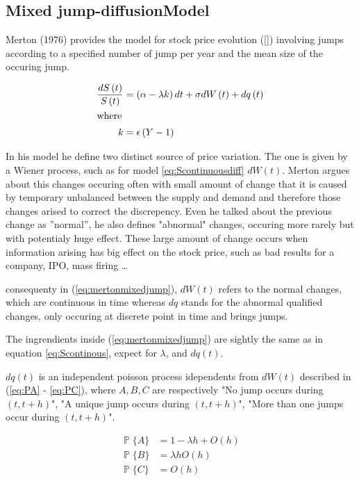 \documentclass[12pt]{report}
\newcommand{\dBm}{dW\left(t\right)}
\newcommand{\dpoiss}{dq\left(t\right)}
\newcommand{\Bm}{W\left(t\right)}
\newcommand{\St}{S\left(t\right)}
\newcommand{\dSt}{dS\left(t\right)}
\newcommand{\dSr}{\frac{\dSt}{\St}}
\begin{document}
\subsection{Mixed jump-diffusionModel}
\label{sub:MixedJump}

Merton (1976) provides the model for stock price evolution (\ref{}) involving jumps according to a specified number of jump per year and the mean size of the occuring jump. 


\begin{align}
   \dSr  &= \left(\alpha - \lambda k\right) dt + \sigma \dBm + \dpoiss \\ \intertext{where}
     \label{eq:mertonmixedjump}
    k &= \epsilon\left(Y-1\right)
\end{align}

In his model he define two distinct source of price variation. The one is given by a Wiener process, such as for model \ref{eq:Scontinuousdiff} $d\Bm$. Merton argues about this changes occuring often with small amount of change that it is caused by temporary unbalanced between the supply and demand and therefore those changes arised to correct the discrepency. Even he talked about the previous change as ''normal'', he also defines "abnormal" changes, occuring more rarely but with potentialy huge effect. These large amount of change occurs when information arising has big effect on the stock price, such as bad results for a company, IPO, mass firing \ldots

consequenty in (\ref{eq:mertonmixedjump}), $\dBm$ refers to the normal changes, which are continuous in time whereas $dq$ stands for the abnormal qualified changes, only occuring at discrete point in time and brings jumps.

The ingrendients inside (\ref{eq:mertonmixedjump}) are sightly the same as in equation \ref{eq:Scontinous}, expect for $\lambda$, and $\dpoiss$. 

$\dpoiss$ is an independent poisson process idependents from $\dBm$ described in (\ref{eq:PA} - \ref{eq:PC}), where $A, B, C$ are respectively "No jump occurs during $\left( t, t + h \right)$", "A unique jump occurs during $\left( t, t + h \right)$", "More than one jumps occur during $\left( t, t + h \right)$".

\begin{align}
  \mathop{\mathbb{P}} \{A\}&= 1 - \lambda h + O\left(h \right) \label{eq:PA}\\
  \mathop{\mathbb{P}} \{B\}&= \lambda h O\left(h \right) \label{eq:PB}\\
  \mathop{\mathbb{P}} \{C\}&=   O\left(h \right) \label{eq:PC}
\end{align}
\end{document}
